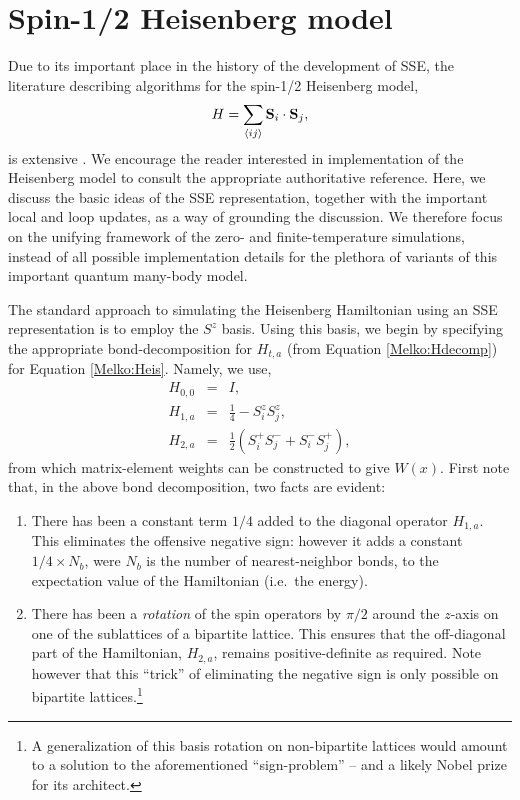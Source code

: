 \documentclass[vecphys]{svmult}
\begin{document}
\section{Spin-1/2 Heisenberg model} \label{Melko:HeisSec}

Due to its important place in the history of the development of SSE, the literature describing algorithms for the spin-1/2 Heisenberg model,
\begin{equation}
H = \sum_{\langle i j \rangle} {\bf S}_i \cdot {\bf S}_j, \label{Melko:Heis}
\end{equation}
is extensive \cite{Melko:Handscomb62, Melko:Henelius00, Melko:Sandvik91, Melko:Sandvik99,  Melko:SandvikHeis,Melko:Syljuasen02}.  We encourage the reader interested in implementation of the Heisenberg model to consult the appropriate authoritative reference. Here, we discuss the basic ideas of the SSE representation, together with the important local and loop updates, as a way of grounding the discussion.  We therefore focus on the unifying framework of the zero- and finite-temperature simulations, instead of all possible implementation details for the plethora of variants of this important quantum many-body model.

The  standard approach to simulating the Heisenberg Hamiltonian using an SSE representation is to employ the $S^z$ basis.  
Using this basis, we begin by specifying the appropriate bond-decomposition for $H_{t,a}$ (from Equation \ref{Melko:Hdecomp}) for Equation \ref{Melko:Heis}.
Namely, we use,
\begin{eqnarray}
H_{0,0} &=&I, \\
H_{1,a} &=& \frac{1}{4} - S^z_i S^z_j, \label{Melko:diagB} \\
H_{2,a} &=& \frac{1}{2} (S^+_i S^-_j + S^-_i S^+_j), \label{Melko:odB}
\end{eqnarray}
from which matrix-element weights can be constructed to give $W(x)$.  First note that, in the above bond decomposition, two facts are evident:
\begin{enumerate}
\item There has been a constant term $1/4$ added to the diagonal operator $H_{1,a}$.  This eliminates the offensive negative sign: however it adds a constant $1/4 \times N_b$, were $N_b$ is the number of nearest-neighbor bonds, to the expectation value of the Hamiltonian (i.e.~the energy).
\item There has been a {\em rotation} of the spin operators by $\pi/2$ around the $z$-axis on one of the sublattices of a bipartite lattice.  This ensures that the off-diagonal part of the Hamiltonian, $H_{2,a}$, remains positive-definite as required.  Note however that this ``trick'' of eliminating the negative sign is only possible on bipartite lattices.\footnote{A generalization of this basis rotation on non-bipartite lattices would amount to a solution to the aforementioned ``sign-problem'' -- and a likely Nobel prize for its architect.}
\end{enumerate}
\end{document}
